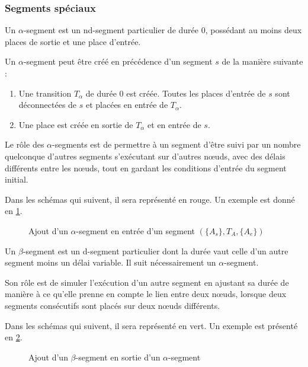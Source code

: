 \subsubsection{Segments spéciaux}
\label{section.alphasegment}
\begin{mydef}
Un $\alpha$-segment est un nd-segment particulier de durée $0$, possédant au moins deux places de sortie et une place d'entrée.
\end{mydef}
Un $\alpha$-segment peut être créé en précédence d'un segment $s$ de la manière suivante : 
\begin{enumerate}
\item Une transition $T_\alpha$ de durée 0 est créée. Toutes les places d'entrée de $s$ sont déconnectées de $s$ et placées en entrée de $T_\alpha$.
\item Une place est créée en sortie de $T_\alpha$ et en entrée de $s$. 
\end{enumerate}

Le rôle des $\alpha$-segments est de permettre à un segment d'être suivi par un nombre quelconque d'autres segments s'exécutant sur d'autres nœuds, avec des délais différents entre les nœuds, tout en gardant les conditions d'entrée du segment initial.

Dans les schémas qui suivent, il sera représenté en \textcolor{BrickRed}{rouge}. Un exemple est donné en \cref{fig.alphaSegment}.

\begin{figure}[H]
	\centering
	
	\caption{Ajout d'un $\alpha$-segment en entrée d'un segment $(\lbrace A_s \rbrace, T_A, \lbrace A_e \rbrace)$}
	\label{fig.alphaSegment}
\end{figure}

\begin{mydef}
Un $\beta$-segment est un d-segment particulier dont la durée vaut celle d'un autre segment moins un délai variable. Il suit nécessairement un $\alpha$-segment.

\end{mydef}
Son rôle est de simuler l'exécution d'un autre segment en ajustant sa durée de manière à ce qu'elle prenne en compte le lien entre deux nœuds, lorsque deux segments consécutifs sont placés sur deux nœuds différents.

Dans les schémas qui suivent, il sera représenté en \textcolor{OliveGreen}{vert}. Un exemple est présenté en \cref{fig.betaSegment}.

\begin{figure}[H]
	\centering
	
	\caption{Ajout d'un $\beta$-segment en sortie d'un $\alpha$-segment}
	\label{fig.betaSegment}
\end{figure}


